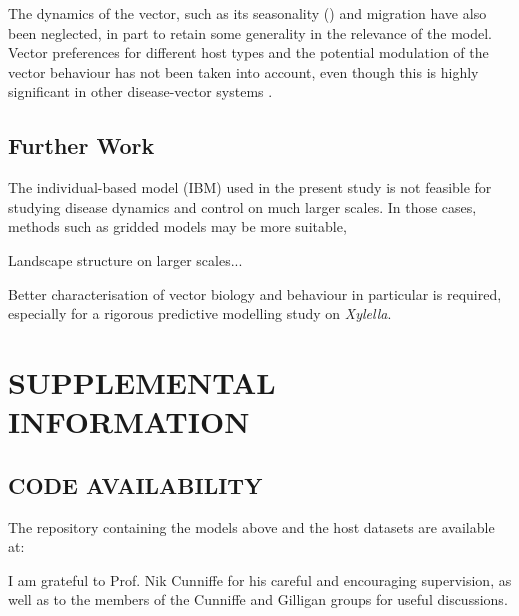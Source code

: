 \documentclass[prstpaper]{revtex4-2}
\begin{document}
The dynamics of the vector, such as its seasonality (\cite{}) and  migration \cite{} have also been neglected, in part to retain some generality in the relevance of the model. Vector preferences for different host types and the potential modulation of the vector behaviour has not been taken into account, even though this is highly significant in other disease-vector systems \cite{Falla2024}.

\subsection*{Further Work}

The individual-based model (IBM) used in the present study is not feasible for studying disease dynamics and control on much larger scales. In those cases, methods such as gridded models may be more suitable, 

Landscape structure on larger scales...

Better characterisation of vector biology and behaviour in particular is required, especially for a rigorous predictive modelling study on \emph{Xylella}. 


\section*{SUPPLEMENTAL INFORMATION}
\subsection*{CODE AVAILABILITY}

The repository containing the models above and the host datasets are available at:



\begin{acknowledgments}
    I am grateful to Prof. Nik Cunniffe for his careful and encouraging supervision, as well as to the members of the Cunniffe and Gilligan groups for useful discussions. 
\end{acknowledgments}
\end{document}
